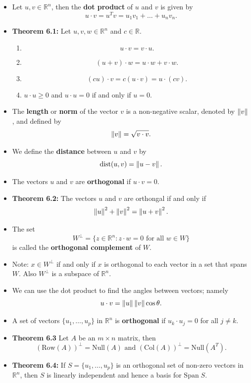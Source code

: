\begin{itemize}
\item Let $u, v \in \mathbb{R}^n$, then the {\bf dot product} of $u$ and $v$ is given by $$u \cdot v= u^{T}v=u_1 v_1+\dots+ u_n v_n.$$
\item {\bf Theorem 6.1:} Let $u, v, w \in \mathbb{R}^n$ and $c\in \mathbb{R}$.
\begin{enumerate}
	\item $$ u \cdot v = v \cdot u.$$
	\item $$(u+v)\cdot w= u \cdot w+ v \cdot w.$$
	\item $$(cu)\cdot v = c(u\cdot v)= u \cdot (cv).$$
	\item $u \cdot u \geq 0$ and $u \cdot u =0$ if and only if $u=0$.
\end{enumerate}
\item  The {\bf length} or {\bf norm} of the vector $v$ is a non-negative scalar, denoted by $\left\lVert v\right\rVert$, and defined by $$\left\lVert v\right\rVert= \sqrt{v\cdot v}.$$
\item We define the {\bf distance} between $u$ and $v$ by $$\text{dist}(u,v)=\left\lVert u-v\right\rVert.$$
\item The vectors $u$ and $v$ are {\bf orthogonal} if $u\cdot v=0$.
\item {\bf Theorem 6.2:} The vectors $u$ and $v$ are orthongal if and only if $$\left\lVert u\right\rVert^2+\left\lVert v\right\rVert^2=\left\lVert u+v\right\rVert^2.$$
\item The set $$W^{\perp} =\{ z \in \mathbb{R}^n: z \cdot w=0 \text{ for all } w \in W\}$$ is called the {\bf orthogonal complement} of $W$.
\item Note: $x \in W^{\perp}$ if and only if $x$ is orthogonal to each vector in a set that spans $W$. Also $W^{\perp}$ is a subspace of $\mathbb{R}^n$.
\item We can use the dot product to find the angles between vectors; namely $$u\cdot v = \left\lVert u\right\rVert \left\lVert v\right\rVert \cos \theta.$$
\item 	A set of vectors $\{ u_1, \dots, u_p\}$ in $\mathbb{R}^n$ is {\bf orthogonal} if $u_k \cdot u_j=0$ for all $j\neq k$.
\item {\bf Theorem 6.3} Let $A$ be an $m\times n$ matrix, then $$(\text{Row}(A))^{\perp} = \text{Null}(A) \text{ and } (\text{Col}(A))^{\perp}= \text{Null}(A^{T}).$$
\item
{\bf Theorem 6.4:} If $S=\{ u_1, \dots, u_p\}$ is an orthogonal set of non-zero vectors in $\mathbb{R}^n$, then $S$ is linearly independent and hence a basis for $\text{Span} \; S$.
\end{itemize}

